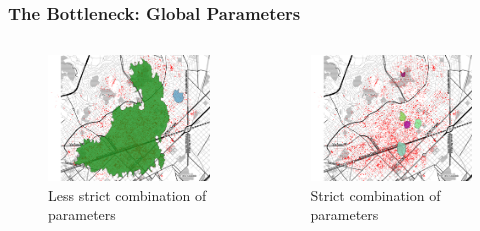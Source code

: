 \documentclass[hyperref={pdfpagelabels=true}]{beamer}
\begin{document}

\begin{frame}
\frametitle{The Bottleneck: Global Parameters}
\begin{columns}
  \begin{column}{0.5\textwidth}
    \begin{figure}  
	\includegraphics[width=\textwidth]{elki_dbscan_005_500.png}\\
           \tiny{Less strict combination of parameters}%
       \end{figure}             
  \end{column}
  \begin{column}{0.5\textwidth}
      \begin{figure}  
	\includegraphics[width=\textwidth]{elki_dbscan_002_500.png}\\
           \tiny{Strict combination of parameters}%
       \end{figure}  
  \end{column}  
\end{columns}
\end{frame}
\end{document}
